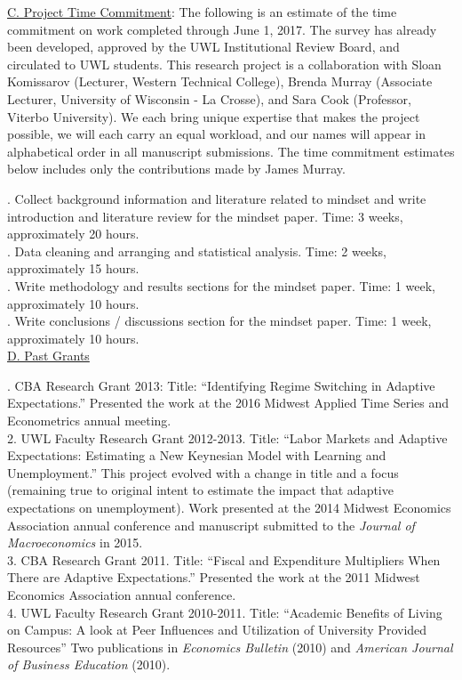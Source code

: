 \documentclass[11pt]{article}
\begin{document}
\noindent \underline{C. Project Time Commitment}:
The following is an estimate of the time commitment on work completed through June 1, 2017.  The survey has already been developed, approved by the UWL Institutional Review Board, and circulated to UWL students. This research project is a collaboration with Sloan Komissarov (Lecturer, Western Technical College), Brenda Murray (Associate Lecturer, University of Wisconsin - La Crosse), and Sara Cook (Professor, Viterbo University). We each bring unique expertise that makes the project possible, we will each carry an equal workload, and our names will appear in alphabetical order in all manuscript submissions.  The time commitment estimates below includes only the contributions made by James Murray. 

. Collect background information and literature related to mindset and write introduction and literature review for the mindset paper.  Time: 3 weeks, approximately 20 hours.\\
. Data cleaning and arranging and statistical analysis. Time: 2 weeks, approximately 15 hours.\\
. Write methodology and results sections for the mindset paper. Time: 1 week, approximately 10 hours.\\
. Write conclusions / discussions section for the mindset paper. Time: 1 week, approximately 10 hours.\\

\noindent \underline{D. Past Grants}

. CBA Research Grant 2013:  Title: ``Identifying Regime Switching in Adaptive Expectations.''  Presented the work at the 2016 Midwest Applied Time Series and Econometrics annual meeting.\\
2. UWL Faculty Research Grant 2012-2013.  Title: ``Labor Markets and Adaptive Expectations: Estimating a New Keynesian Model with Learning and Unemployment.'' This project evolved with a change in title and a focus (remaining true to original intent to estimate the impact that adaptive expectations on unemployment).  Work presented at the 2014 Midwest Economics Association annual conference and manuscript submitted to the \textit{Journal of Macroeconomics} in 2015.  \\
3. CBA Research Grant 2011.  Title: ``Fiscal and Expenditure Multipliers When There are Adaptive Expectations.''  Presented the work at the 2011 Midwest Economics Association annual conference.\\
4. UWL Faculty Research Grant 2010-2011.  Title: ``Academic Benefits of Living on Campus: A look at Peer Influences and Utilization of University Provided Resources'' Two publications in \textit{Economics Bulletin} (2010) and \textit{American Journal of Business Education} (2010).  
  
\end{document}
